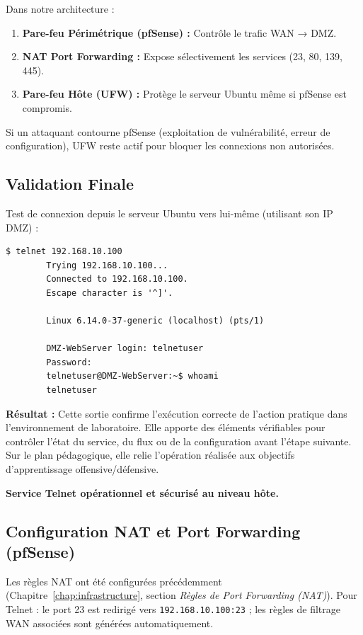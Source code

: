 \documentclass[12pt,a4paper,openany]{report}
\begin{document}
	\begin{tcolorbox}[colback=secondary!5!white, colframe=secondary, title=\textbf{Couches de Sécurité Multiples}]
		Dans notre architecture :
		\begin{enumerate}
			\item \textbf{Pare-feu Périmétrique (pfSense) :} Contrôle le trafic WAN → DMZ.
			\item \textbf{NAT Port Forwarding :} Expose sélectivement les services (23, 80, 139, 445).
			\item \textbf{Pare-feu Hôte (UFW) :} Protège le serveur Ubuntu même si pfSense est compromis.
		\end{enumerate}
		
		Si un attaquant contourne pfSense (exploitation de vulnérabilité, erreur de configuration), UFW reste actif pour bloquer les connexions non autorisées.
	\end{tcolorbox}
	
	\subsection{Validation Finale}
	Test de connexion depuis le serveur Ubuntu vers lui-même (utilisant son IP DMZ) :
	
	\begin{lstlisting}[caption=Test Telnet avec IP DMZ]
		$ telnet 192.168.10.100
		Trying 192.168.10.100...
		Connected to 192.168.10.100.
		Escape character is '^]'.
		
		Linux 6.14.0-37-generic (localhost) (pts/1)
		
		DMZ-WebServer login: telnetuser
		Password:
		telnetuser@DMZ-WebServer:~$ whoami
		telnetuser
	\end{lstlisting}
	
	\textbf{Résultat :} Cette sortie confirme l'exécution correcte de l'action pratique dans l'environnement de laboratoire. Elle apporte des éléments vérifiables pour contrôler l'état du service, du flux ou de la configuration avant l'étape suivante. Sur le plan pédagogique, elle relie l'opération réalisée aux objectifs d'apprentissage offensive/défensive.
	
	
	\textcolor{green}{\checkmark} \textbf{Service Telnet opérationnel et sécurisé au niveau hôte.}
	
	\subsection{Configuration NAT et Port Forwarding (pfSense)}
	Les règles NAT ont été configurées précédemment (Chapitre~\ref{chap:infrastructure}, section \textit{Règles de Port Forwarding (NAT)}). Pour Telnet : le port 23 est redirigé vers \texttt{192.168.10.100:23} ; les règles de filtrage WAN associées sont générées automatiquement.
	
\end{document}

